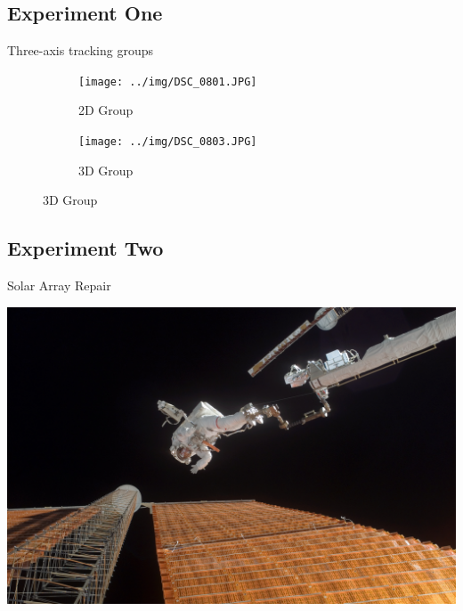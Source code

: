 \documentclass[10pt]{beamer}
\begin{document}
\subsection{Experiment One}
\begin{frame}[fragile]{Three-axis tracking groups}
  \begin{figure}[tb!]
    \begin{center}
      \begin{subfigure}{0.49\textwidth}
        \texttt{[image: ../img/DSC\_0801.JPG]}
        \caption{2D Group}
      \end{subfigure}\hfill
      \begin{subfigure}{0.49\textwidth}
        \texttt{[image: ../img/DSC\_0803.JPG]}
        \caption{3D Group}
      \end{subfigure}
    \end{center}
  \end{figure}
\end{frame}

\subsection{Experiment Two}

\begin{frame}[fragile]{Solar Array Repair}
  \begin{center}
    \includegraphics[width=\textwidth]{../img/Astronaut_Scott_Parazynski_repairs_a_damaged_ISS_solar_panel.jpg}
  \end{center}
\end{frame}
\end{document}
